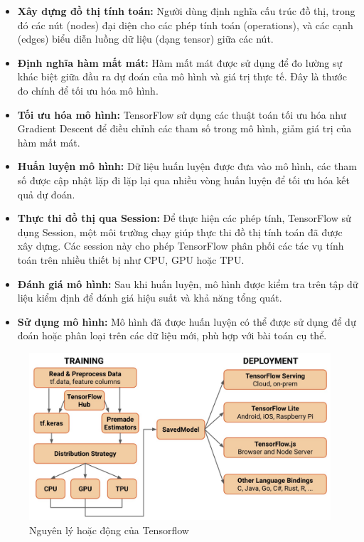 \begin{itemize}
    \item \textbf{Xây dựng đồ thị tính toán:} Người dùng định nghĩa cấu trúc đồ thị, trong đó các nút (nodes) đại diện cho các phép tính toán (operations), và các cạnh (edges) biểu diễn luồng dữ liệu (dạng tensor) giữa các nút.
    \item \textbf{Định nghĩa hàm mất mát:} Hàm mất mát được sử dụng để đo lường sự khác biệt giữa đầu ra dự đoán của mô hình và giá trị thực tế. Đây là thước đo chính để tối ưu hóa mô hình.
    \item \textbf{Tối ưu hóa mô hình:} TensorFlow sử dụng các thuật toán tối ưu hóa như Gradient Descent để điều chỉnh các tham số trong mô hình, giảm giá trị của hàm mất mát.
    \item \textbf{Huấn luyện mô hình:} Dữ liệu huấn luyện được đưa vào mô hình, các tham số được cập nhật lặp đi lặp lại qua nhiều vòng huấn luyện để tối ưu hóa kết quả dự đoán.
    \item \textbf{Thực thi đồ thị qua Session:} Để thực hiện các phép tính, TensorFlow sử dụng Session, một môi trường chạy giúp thực thi đồ thị tính toán đã được xây dựng. Các session này cho phép TensorFlow phân phối các tác vụ tính toán trên nhiều thiết bị như CPU, GPU hoặc TPU.
    \item \textbf{Đánh giá mô hình:} Sau khi huấn luyện, mô hình được kiểm tra trên tập dữ liệu kiểm định để đánh giá hiệu suất và khả năng tổng quát.
    \item \textbf{Sử dụng mô hình:} Mô hình đã được huấn luyện có thể được sử dụng để dự đoán hoặc phân loại trên các dữ liệu mới, phù hợp với bài toán cụ thể.
\end{itemize}
\begin{figure}[H]
    \centering
    \includegraphics[width=\textwidth,height=\textheight,keepaspectratio]{Images/Theoretical basis/nguyen-li-hoat-dong-tensorflow.jpeg}
    \caption{Nguyên lý hoặc động của Tensorflow}
    \label{fig:enter-label}
\end{figure}


